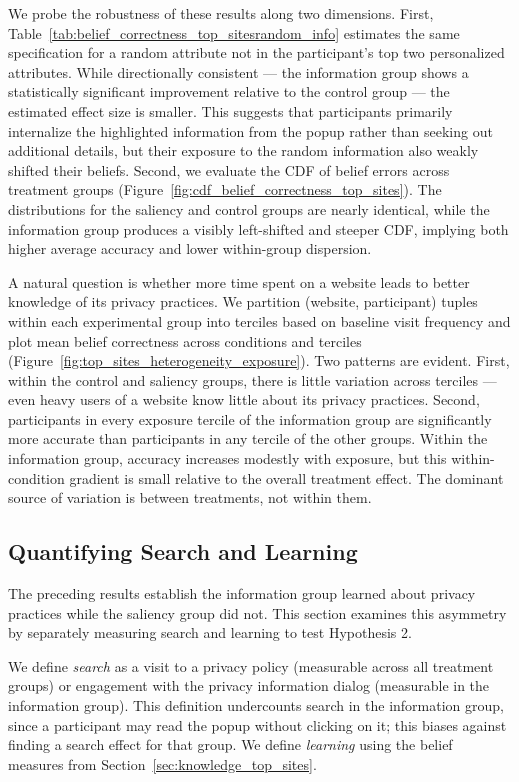 \documentclass[12pt]{article}
\theoremstyle{definition}
\theoremstyle{remark}
\begin{document}
We probe the robustness of these results along two dimensions. First, Table~\ref{tab:belief_correctness_top_sitesrandom_info} estimates the same specification for a random attribute not in the participant's top two personalized attributes. While directionally consistent --- the information group shows a statistically significant improvement relative to the control group --- the estimated effect size is smaller. This suggests that participants primarily internalize the highlighted information from the popup rather than seeking out additional details, but their exposure to the random information also weakly shifted their beliefs. Second, we evaluate the CDF of belief errors across treatment groups (Figure~\ref{fig:cdf_belief_correctness_top_sites}). The distributions for the saliency and control groups are nearly identical, while the information group produces a visibly left-shifted and steeper CDF, implying both higher average accuracy and lower within-group dispersion.

A natural question is whether more time spent on a website leads to better knowledge of its privacy practices. We partition (website, participant) tuples within each experimental group into terciles based on baseline visit frequency and plot mean belief correctness across conditions and terciles (Figure~\ref{fig:top_sites_heterogeneity_exposure}). Two patterns are evident. First, within the control and saliency groups, there is little variation across terciles --- even heavy users of a website know little about its privacy practices. Second, participants in every exposure tercile of the information group are significantly more accurate than participants in any tercile of the other groups. Within the information group, accuracy increases modestly with exposure, but this within-condition gradient is small relative to the overall treatment effect. The dominant source of variation is between treatments, not within them.

\subsection{Quantifying Search and Learning}\label{sec:search_learning}

The preceding results establish the information group learned about privacy practices while the saliency group did not. This section examines this asymmetry by separately measuring search and learning to test Hypothesis 2. 

We define \emph{search} as a visit to a privacy policy (measurable across all treatment groups) or engagement with the privacy information dialog (measurable in the information group). This definition undercounts search in the information group, since a participant may read the popup without clicking on it; this biases against finding a search effect for that group. We define \emph{learning} using the belief measures from Section~\ref{sec:knowledge_top_sites}.
\end{document}
